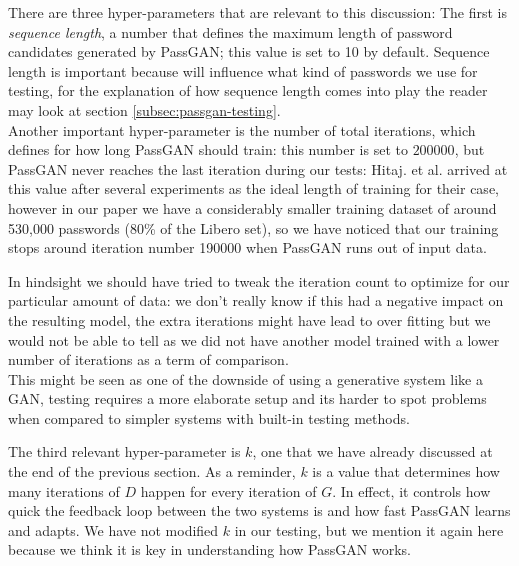 There are three hyper-parameters that are relevant to this discussion: The first is \emph{sequence length}, a number that defines the maximum length of password candidates generated by PassGAN; this value is set to 10 by default. Sequence length is important because will influence what kind of passwords we use for testing, for the explanation of how sequence length comes into play the reader may look at section \ref{subsec:passgan-testing}.\\
Another important hyper-parameter is the number of total iterations, which defines for how long PassGAN should train: this number is set to $200000$, but PassGAN never reaches the last iteration during our tests: Hitaj. et al. arrived at this value after several experiments as the ideal length of training for their case, however in our paper we have a considerably smaller training dataset of around 530,000 passwords (80\% of the Libero set), so we have noticed that our training stops around iteration number 190000 when PassGAN runs out of input data.

In hindsight we should have tried to tweak the iteration count to optimize for our particular amount of data: we don't really know if this had a negative impact on the resulting model, the extra iterations might have lead to over fitting but we would not be able to tell as we did not have another model trained with a lower number of iterations as a term of comparison.\\
This might be seen as one of the downside of using a generative system like a GAN, testing requires a more elaborate setup and its harder to spot problems when compared to simpler systems with built-in testing methods. 

The third relevant hyper-parameter is $k$, one that we have already discussed at the end of the previous section. As a reminder, $k$ is a value that determines how many iterations of $D$ happen for every iteration of $G$. In effect, it controls how quick the feedback loop between the two systems is and how fast PassGAN learns and adapts. We have not modified $k$ in our testing, but we mention it again here because we think it is key in understanding how PassGAN works. 
